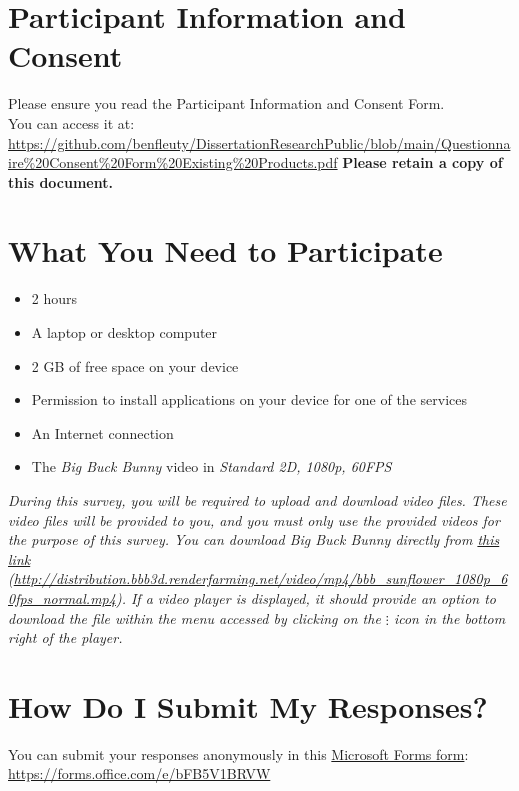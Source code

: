 \section{Participant Information and Consent}
Please ensure you read the Participant Information and Consent Form.
\\
You can access it at:
\\
\href{https://github.com/benfleuty/DissertationResearchPublic/blob/main/Questionnaire%20Consent%20Form%20Existing%20Products.pdf}{\url{https://github.com/benfleuty/DissertationResearchPublic/blob/main/Questionnaire\%20Consent\%20Form\%20Existing\%20Products.pdf}}
\newline
\textbf{Please retain a copy of this document.}

\section{What You Need to Participate}

\begin{itemize}
\item 2 hours
\item A laptop or desktop computer
\item 2 GB of free space on your device
\item Permission to install applications on your device for one of the services
\item An Internet connection
\item The \emph{Big Buck Bunny} video in \emph{Standard 2D, 1080p, 60FPS}
\end{itemize}

\emph{During this survey, you will be required to upload and download video files. These video files will be provided to you, and you must only use the provided videos for the purpose of this survey.
You can download Big Buck Bunny directly from \href{http://distribution.bbb3d.renderfarming.net/video/mp4/bbb_sunflower_1080p_60fps_normal.mp4}{this link} (\href{http://distribution.bbb3d.renderfarming.net/video/mp4/bbb_sunflower_1080p_60fps_normal.mp4}{\url{http://distribution.bbb3d.renderfarming.net/video/mp4/bbb_sunflower_1080p_60fps_normal.mp4}}). If a video player is displayed, it should provide an option to download the file within the menu accessed by clicking on the \textbf{$\vdots$} icon in the bottom right of the player.}

\section{How Do I Submit My Responses?}
You can submit your responses anonymously in this \href{https://forms.office.com/e/bFB5V1BRVW}{Microsoft Forms form}:\newline
\href{https://forms.office.com/e/bFB5V1BRVW}{\url{https://forms.office.com/e/bFB5V1BRVW}}

